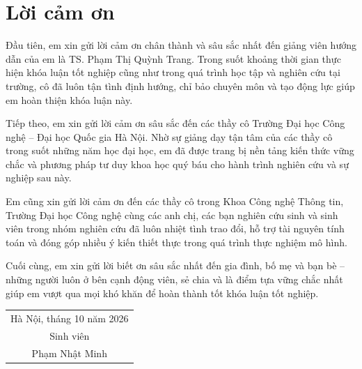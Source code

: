 \chapter*{Lời cảm ơn}

Đầu tiên, em xin gửi lời cảm ơn chân thành và sâu sắc nhất đến giảng viên hướng dẫn của em là TS. Phạm Thị Quỳnh Trang. Trong suốt khoảng thời gian thực hiện khóa luận tốt nghiệp cũng như trong quá trình học tập và nghiên cứu tại trường, cô đã luôn tận tình định hướng, chỉ bảo chuyên môn và tạo động lực giúp em hoàn thiện khóa luận này.

Tiếp theo, em xin gửi lời cảm ơn sâu sắc đến các thầy cô Trường Đại học Công nghệ -- Đại học Quốc gia Hà Nội. Nhờ sự giảng dạy tận tâm của các thầy cô trong suốt những năm học đại học, em đã được trang bị nền tảng kiến thức vững chắc và phương pháp tư duy khoa học quý báu cho hành trình nghiên cứu và sự nghiệp sau này.

Em cũng xin gửi lời cảm ơn đến các thầy cô trong Khoa Công nghệ Thông tin, Trường Đại học Công nghệ cùng các anh chị, các bạn nghiên cứu sinh và sinh viên trong nhóm nghiên cứu đã luôn nhiệt tình trao đổi, hỗ trợ tài nguyên tính toán và đóng góp nhiều ý kiến thiết thực trong quá trình thực nghiệm mô hình.

Cuối cùng, em xin gửi lời biết ơn sâu sắc nhất đến gia đình, bố mẹ và bạn bè -- những người luôn ở bên cạnh động viên, sẻ chia và là điểm tựa vững chắc nhất giúp em vượt qua mọi khó khăn để hoàn thành tốt khóa luận tốt nghiệp.

\vspace{1cm}
\begin{flushright}
\begin{tabular}{@{}c@{}}
Hà Nội, tháng 10 năm 2026\\
Sinh viên\\[1cm]
Phạm Nhật Minh
\end{tabular}
\end{flushright}

